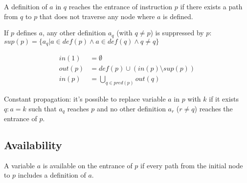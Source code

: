 A definition of $a$ in $q$ reaches the entrance of instruction $p$ if there exists a path from $q$ to $p$ that does not traverse any node where $a$ is defined.

If $p$ defines $a$, any other definition $a_q$ (with $q\ne p$) is suppressed by $p$: $sup(p) = \{a_q | a \in def(p) \land a \in def(q) \land q \ne q\}$

\begin{align*}
    in(1) &= \emptyset \\
    out(p) &= def(p) \cup (in(p) \setminus sup(p)) \\
    in(p) &= \bigcup_{q\in pred(p)} out(q)
\end{align*}

Constant propagation: it's possible to replace variable $a$ in $p$ with $k$ if it exists $q: a = k$ such that $a_q$ reaches $p$ and no other definition $a_r$ ($r\ne q$) reaches the entrance of $p$.

\subsection{Availability}

A variable $a$ is available on the entrance of $p$ if every path from the initial node to $p$ includes a definition of $a$.
